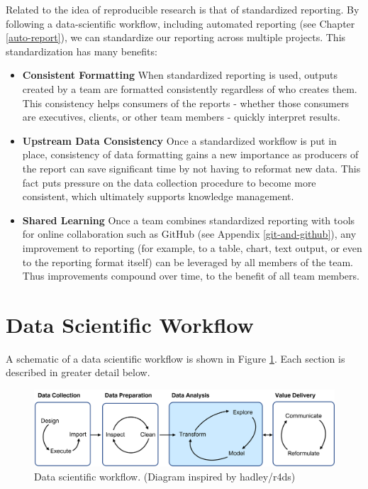 \documentclass[
]{krantz}
\providecommand{\tightlist}{%
  \setlength{\itemsep}{0pt}\setlength{\parskip}{0pt}}
\begin{document}
Related to the idea of reproducible research is that of standardized reporting. By following a data-scientific workflow, including automated reporting (see Chapter \ref{auto-report}), we can standardize our reporting across multiple projects. This standardization has many benefits:

\begin{itemize}
\tightlist
\item
  \textbf{Consistent Formatting} When standardized reporting is used, outputs created by a team are formatted consistently regardless of who creates them. This consistency helps consumers of the reports - whether those consumers are executives, clients, or other team members - quickly interpret results.
\item
  \textbf{Upstream Data Consistency} Once a standardized workflow is put in place, consistency of data formatting gains a new importance as producers of the report can save significant time by not having to reformat new data. This fact puts pressure on the data collection procedure to become more consistent, which ultimately supports knowledge management.
\item
  \textbf{Shared Learning} Once a team combines standardized reporting with tools for online collaboration such as GitHub (see Appendix \ref{git-and-github}), any improvement to reporting (for example, to a table, chart, text output, or even to the reporting format itself) can be leveraged by all members of the team. Thus improvements compound over time, to the benefit of all team members.
\end{itemize}

\hypertarget{data-scientific-workflow}{%
\section{Data Scientific Workflow}\label{data-scientific-workflow}}

A schematic of a data scientific workflow is shown in Figure \ref{fig:ds-workflow}. Each section is described in greater detail below.

\begin{figure}
\includegraphics[width=0.9\linewidth]{images/data_science_workflow2} \caption{Data scientific workflow. (Diagram inspired by hadley/r4ds)}\label{fig:ds-workflow}
\end{figure}
\end{document}
